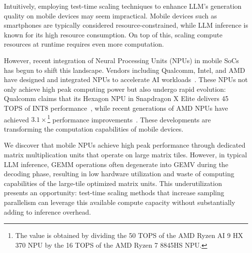 Intuitively, employing test-time scaling techniques to enhance LLM's generation quality on mobile devices may seem impractical. Mobile devices such as smartphones are typically considered resource-constrained, while LLM inference is known for its high resource consumption. On top of this, scaling compute resources at runtime requires even more computation.

However, recent integration of Neural Processing Units (NPUs) in mobile SoCs has begun to shift this landscape. Vendors including Qualcomm, Intel, and AMD have designed and integrated NPUs to accelerate AI workloads~\cite{hexagon,intel-npu,amd-xdna}. These NPUs not only achieve high peak computing power but also undergo rapid evolution: Qualcomm claims that its Hexagon NPU in Snapdragon X Elite delivers 45 TOPS of INT8 performance~\cite{qualcomm_on_device_ai}, while recent generations of AMD NPUs have achieved $3.1\times$\footnote{The value is obtained by dividing the 50 TOPS of the AMD Ryzen AI 9 HX 370 NPU by the 16 TOPS of the AMD Ryzen 7 8845HS NPU.} performance improvements~\cite{amd_processors_specs}. These developments are transforming the computation capabilities of mobile devices.



We discover that mobile NPUs achieve high peak performance through dedicated matrix multiplication units that operate on large matrix tiles. However, in typical LLM inference, GEMM operations often degenerate into GEMV during the decoding phase, resulting in low hardware utilization and waste of computing capabilities of the large-tile optimized matrix units. This underutilization presents an opportunity: test-time scaling methods that increase sampling parallelism can leverage this available compute capacity without substantially adding to inference overhead.

